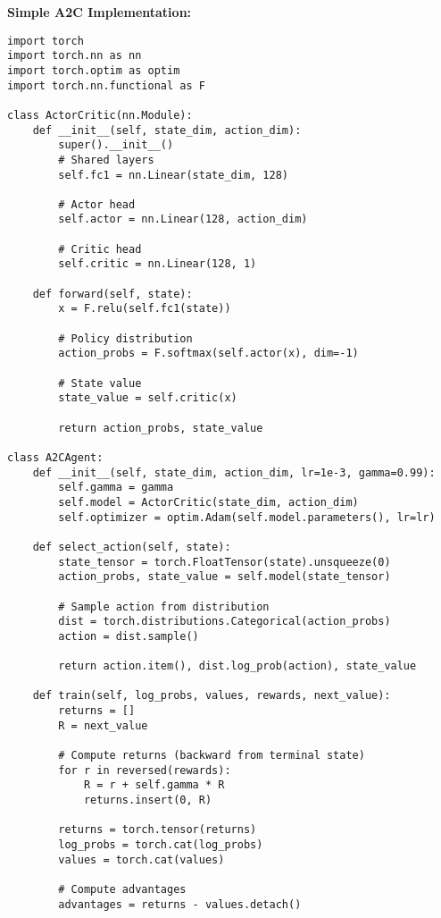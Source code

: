 \begin{codebox}
\textbf{Simple A2C Implementation:}

\begin{lstlisting}
import torch
import torch.nn as nn
import torch.optim as optim
import torch.nn.functional as F

class ActorCritic(nn.Module):
    def __init__(self, state_dim, action_dim):
        super().__init__()
        # Shared layers
        self.fc1 = nn.Linear(state_dim, 128)
        
        # Actor head
        self.actor = nn.Linear(128, action_dim)
        
        # Critic head
        self.critic = nn.Linear(128, 1)
    
    def forward(self, state):
        x = F.relu(self.fc1(state))
        
        # Policy distribution
        action_probs = F.softmax(self.actor(x), dim=-1)
        
        # State value
        state_value = self.critic(x)
        
        return action_probs, state_value

class A2CAgent:
    def __init__(self, state_dim, action_dim, lr=1e-3, gamma=0.99):
        self.gamma = gamma
        self.model = ActorCritic(state_dim, action_dim)
        self.optimizer = optim.Adam(self.model.parameters(), lr=lr)
    
    def select_action(self, state):
        state_tensor = torch.FloatTensor(state).unsqueeze(0)
        action_probs, state_value = self.model(state_tensor)
        
        # Sample action from distribution
        dist = torch.distributions.Categorical(action_probs)
        action = dist.sample()
        
        return action.item(), dist.log_prob(action), state_value
    
    def train(self, log_probs, values, rewards, next_value):
        returns = []
        R = next_value
        
        # Compute returns (backward from terminal state)
        for r in reversed(rewards):
            R = r + self.gamma * R
            returns.insert(0, R)
        
        returns = torch.tensor(returns)
        log_probs = torch.cat(log_probs)
        values = torch.cat(values)
        
        # Compute advantages
        advantages = returns - values.detach()
        

\end{lstlisting}
\end{codebox}
